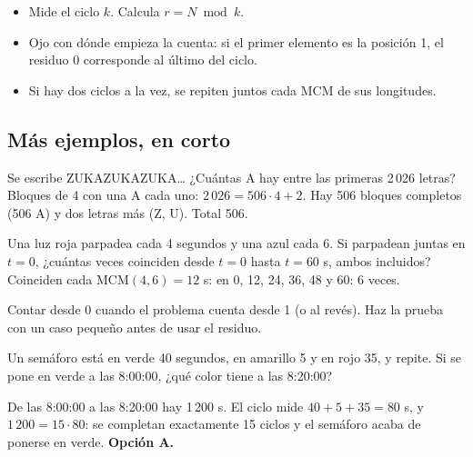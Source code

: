 \begin{regla}
\begin{itemize}
  \item Mide el ciclo $k$. Calcula $r = N \bmod k$.
  \item Ojo con dónde empieza la cuenta: si el primer elemento es la posición 1, el residuo 0 corresponde al último del
  ciclo.
  \item Si hay dos ciclos a la vez, se repiten juntos cada MCM de sus longitudes.
\end{itemize}
\end{regla}

\subsection{Más ejemplos, en corto}
\begin{ejemplo}
Se escribe ZUKAZUKAZUKA… ¿Cuántas A hay entre las primeras 2\,026 letras?
\solucion Bloques de 4 con una A cada uno: $2\,026 = 506 \cdot 4 + 2$. Hay 506 bloques completos (506 A) y dos letras
más (Z, U). Total 506.
\end{ejemplo}

\begin{ejemplo}
Una luz roja parpadea cada 4 segundos y una azul cada 6. Si parpadean juntas en $t = 0$, ¿cuántas veces coinciden desde $t = 0$ hasta $t = 60$ s, ambos incluidos?
\solucion Coinciden cada MCM$(4, 6) = 12$ s: en 0, 12, 24, 36, 48 y 60: 6 veces.
\end{ejemplo}

\begin{trampa}
Contar desde 0 cuando el problema cuenta desde 1 (o al revés). Haz la prueba con un caso pequeño antes de usar el
residuo.
\end{trampa}

\begin{reto}
Un semáforo está en verde 40 segundos, en amarillo 5 y en rojo 35, y repite. Si se pone en verde a las 8:00:00, ¿qué
color tiene a las 8:20:00?
\end{reto}

\begin{retoresuelto}
De las 8:00:00 a las 8:20:00 hay 1\,200 s. El ciclo mide $40 + 5 + 35 = 80$ s, y $1\,200 = 15 \cdot 80$: se completan
exactamente 15 ciclos y el semáforo acaba de ponerse en verde. \textbf{Opción A.}
\end{retoresuelto}

